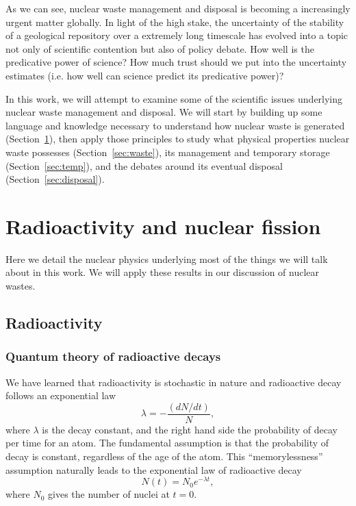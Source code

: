 \documentclass[nofootinbib,preprint,aip,pra]{revtex4-1}
\begin{document}
As we can see, nuclear waste management and disposal is becoming a increasingly urgent matter globally.
In light of the high stake,
the uncertainty of the stability of a geological repository over a extremely long timescale has evolved into 
a topic not only of scientific contention but also of policy debate.
How well is the predicative power of science? How much trust should we put into the uncertainty estimates
(i.e. how well can science predict its predicative power)?

In this work, we will attempt to examine some of the scientific issues underlying nuclear waste management
and disposal. We will start by building up some
language and knowledge necessary to understand how nuclear waste is generated (Section~\ref{sec:phys}),
then apply those principles to study
what physical properties nuclear waste possesses (Section~\ref{sec:waste}), its management and temporary storage
(Section~\ref{sec:temp}), and the debates around its eventual disposal (Section~\ref{sec:disposal}).

\section{Radioactivity and nuclear fission}
\label{sec:phys}
    Here we detail the nuclear physics underlying most of the things we will talk about
    in this work. We will apply these results in our discussion of nuclear wastes.
    \subsection{Radioactivity}
        \subsubsection{Quantum theory of radioactive decays}
        We have learned that radioactivity is stochastic in nature and radioactive decay follows
        an exponential law
        \begin{equation} \label{eq:exp}
            \lambda = -\frac{(dN/dt)}{N},
        \end{equation}
        where $\lambda$ is the decay constant, and the right hand side the probability of decay
        per time for an atom. The fundamental assumption is that the probability of decay is constant,
        regardless of the age of the atom. This ``memorylessness'' assumption naturally leads to the
        exponential law of radioactive decay
        \begin{equation}
            N(t) = N_0 e^{-\lambda t},
        \end{equation}
        where $N_0$ gives the number of nuclei at $t=0$.
\end{document}

